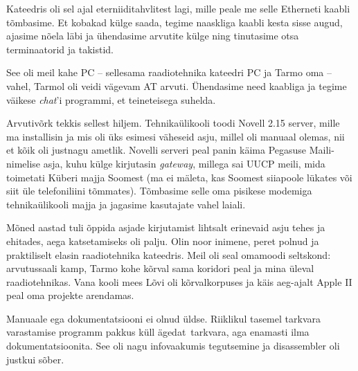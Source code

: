 Kateedris oli sel ajal eterniiditahvlitest lagi, mille peale me selle Etherneti kaabli tõmbasime. Et kobakad külge saada, tegime
naaskliga kaabli kesta sisse augud, ajasime nõela läbi ja ühendasime
arvutite külge ning tinutasime otsa terminaatorid ja takistid. 


See oli meil kahe PC -- sellesama raadiotehnika kateedri PC ja Tarmo oma -- vahel, Tarmol oli 
veidi vägevam AT arvuti. Ühendasime need 
kaabliga ja tegime väikese 
\emph{chat}'i programmi, et teineteisega suhelda. 

Arvutivõrk tekkis sellest hiljem. Tehnikaülikooli toodi Novell 2.15 
server, mille ma installisin ja mis oli üks esimesi väheseid asju, millel oli manuaal 
olemas, nii et kõik oli justnagu ametlik. Novelli serveri peal panin käima Pegasuse 
Maili-nimelise asja, kuhu külge kirjutasin \emph{gateway}, 
millega sai UUCP meili, mida toimetati Küberi 
majja Soomest (ma ei mäleta, kas Soomest siiapoole lükates või siit 
üle telefoniliini tõmmates). Tõmbasime selle oma pisikese modemiga 
tehnikaülikooli majja ja jagasime kasutajate vahel laiali.


Mõned aastad tuli õppida asjade kirjutamist lihtsalt erinevaid asju tehes ja ehitades, aega katsetamiseks oli palju. 
Olin noor inimene, peret polnud ja praktiliselt elasin raadiotehnika 
kateedris. Meil oli seal omamoodi seltskond: arvutussaali 
kamp, Tarmo kohe kõrval sama 
koridori peal ja mina üleval raadiotehnikas. Vana kooli mees 
Lõvi oli kõrvalkorpuses ja käis aeg-ajalt Apple II peal 
oma projekte arendamas.


Manuaale ega dokumentatsiooni ei olnud üldse. Riiklikul 
tasemel tarkvara varastamise programm pakkus küll ägedat tarkvara, aga 
enamasti ilma dokumentatsioonita. See oli nagu infovaakumis 
tegutsemine ja disassembler oli justkui sõber.

